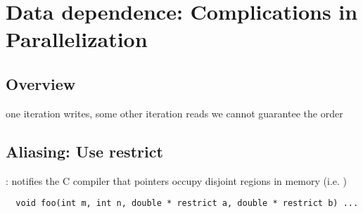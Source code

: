 \documentclass{myproc}
\begin{document}
\section{Data dependence: Complications in Parallelization}
\subsection{Overview}
\bit
\w one iteration writes, some other iteration reads
\w we cannot guarantee the order
\eit

\subsection{Aliasing: Use restrict}
\bit
\w {}: notifies the C compiler that pointers occupy
disjoint regions in memory (i.e. )
  \begin{verbatim}
  void foo(int m, int n, double * restrict a, double * restrict b) ...
  \end{verbatim}
\eit
\end{document}
